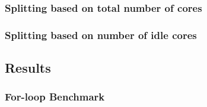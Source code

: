 \subsubsection{Splitting based on total number of cores}

\subsubsection{Splitting based on number of idle cores}

\subsection{Results}

\subsubsection{For-loop Benchmark}


